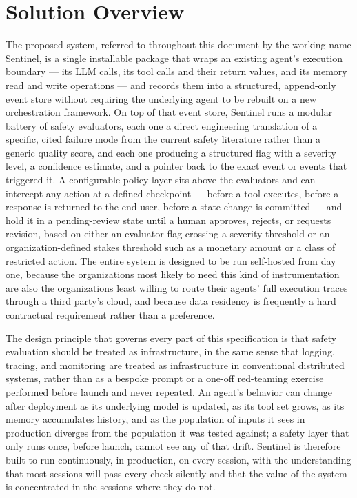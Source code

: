 \documentclass[11pt,a4paper]{article}
\begin{document}
\section{Solution Overview}

The proposed system, referred to throughout this document by the working name Sentinel, is a single installable package that wraps an existing agent's execution boundary --- its LLM calls, its tool calls and their return values, and its memory read and write operations --- and records them into a structured, append-only event store without requiring the underlying agent to be rebuilt on a new orchestration framework. On top of that event store, Sentinel runs a modular battery of safety evaluators, each one a direct engineering translation of a specific, cited failure mode from the current safety literature rather than a generic quality score, and each one producing a structured flag with a severity level, a confidence estimate, and a pointer back to the exact event or events that triggered it. A configurable policy layer sits above the evaluators and can intercept any action at a defined checkpoint --- before a tool executes, before a response is returned to the end user, before a state change is committed --- and hold it in a pending-review state until a human approves, rejects, or requests revision, based on either an evaluator flag crossing a severity threshold or an organization-defined stakes threshold such as a monetary amount or a class of restricted action. The entire system is designed to be run self-hosted from day one, because the organizations most likely to need this kind of instrumentation are also the organizations least willing to route their agents' full execution traces through a third party's cloud, and because data residency is frequently a hard contractual requirement rather than a preference.

The design principle that governs every part of this specification is that safety evaluation should be treated as infrastructure, in the same sense that logging, tracing, and monitoring are treated as infrastructure in conventional distributed systems, rather than as a bespoke prompt or a one-off red-teaming exercise performed before launch and never repeated. An agent's behavior can change after deployment as its underlying model is updated, as its tool set grows, as its memory accumulates history, and as the population of inputs it sees in production diverges from the population it was tested against; a safety layer that only runs once, before launch, cannot see any of that drift. Sentinel is therefore built to run continuously, in production, on every session, with the understanding that most sessions will pass every check silently and that the value of the system is concentrated in the sessions where they do not.
\end{document}
